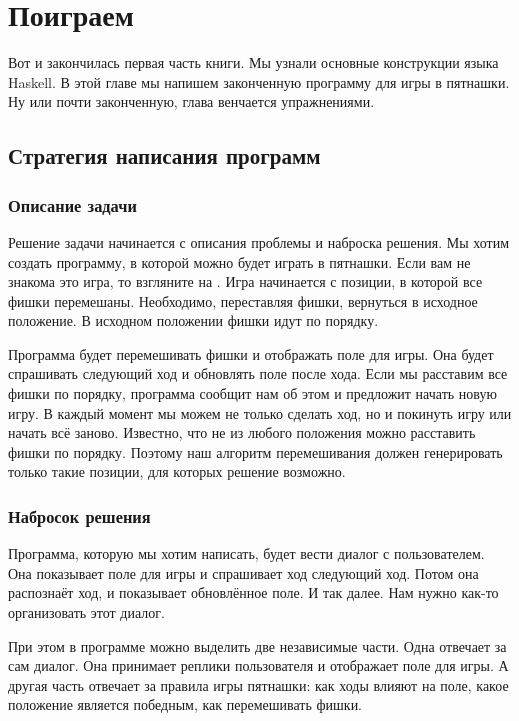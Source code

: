 \setcounter{chapter}{11}
\chapter{Поиграем}

Вот и закончилась первая часть книги. Мы узнали
основные конструкции языка Haskell. В этой главе
мы напишем законченную программу для игры в пятнашки.
Ну или почти законченную, глава венчается упражнениями.

\section{Стратегия написания программ}

\subsection{Описание задачи}

Решение задачи начинается с описания проблемы и 
наброска решения. Мы хотим создать программу, в которой можно
будет играть в пятнашки. Если вам не знакома
это игра, то взгляните на . Игра начинается
с позиции, в которой все фишки перемешаны. 
Необходимо, переставляя фишки, вернуться в исходное
положение. В исходном положении фишки идут по порядку.


Программа будет перемешивать фишки и отображать
поле для игры. Она будет спрашивать следующий ход и
обновлять поле после хода. Если мы расставим все фишки по порядку,
программа сообщит нам об этом и предложит начать
новую игру. В каждый момент мы можем не только 
сделать ход, но и покинуть игру или начать всё заново.
Известно, что не из любого положения можно расставить
фишки по порядку. Поэтому наш алгоритм перемешивания
должен генерировать только такие позиции, для которых
решение возможно.


\subsection{Набросок решения}

Программа, которую мы хотим написать, будет вести диалог
с пользователем. Она показывает поле для игры и спрашивает
ход следующий ход. Потом она распознаёт ход, и показывает обновлённое
поле. И так далее. Нам нужно как-то организовать этот диалог.

При этом в программе можно выделить две независимые части.
Одна отвечает за сам диалог. Она принимает реплики пользователя
и отображает поле для игры. А другая часть отвечает за правила
игры пятнашки: как ходы влияют на поле, какое положение является
победным, как перемешивать фишки. 

